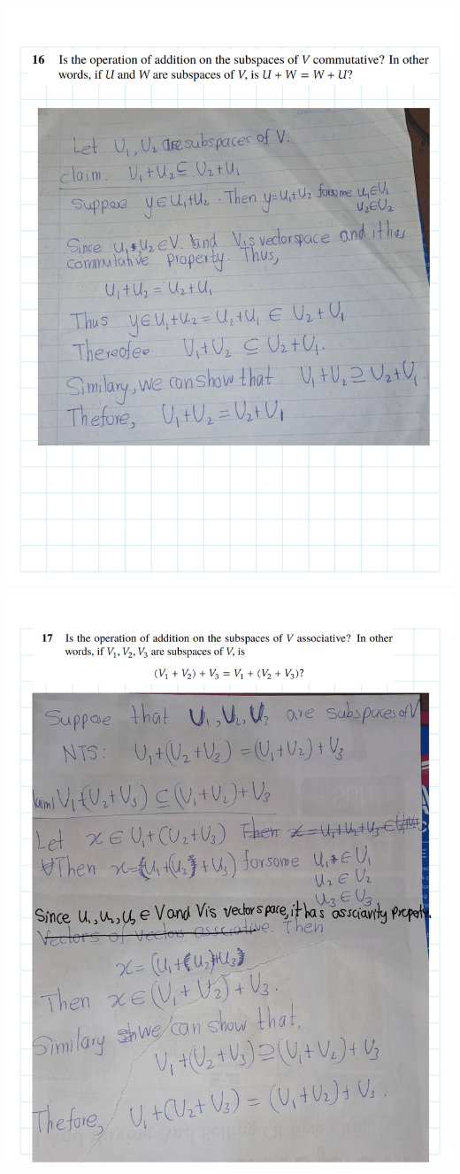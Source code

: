 \documentclass[
]{book}
\theoremstyle{definition}
\theoremstyle{definition}
\theoremstyle{definition}
\theoremstyle{definition}
\theoremstyle{remark}
\begin{document}
\begin{enumerate}
  \includegraphics{fig/Ex1C/Ex/Ex-18.png} \includegraphics{fig/Ex1C/Ex/Ex-19.png}

\end{enumerate}
\end{document}
